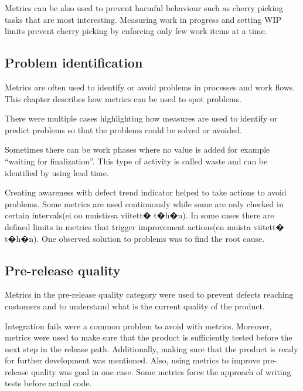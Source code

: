 \documentclass{sig-alternate}
\begin{document}
Metrics can be also used to prevent harmful behaviour such as cherry picking
tasks that are most interesting. Measuring work in progress and setting WIP
limits prevent cherry picking by enforcing only few work items at a
time.\cite{Middleton2007387}

\subsection{Problem identification}
\label{ProblemIdentification}
Metrics are often used to identify or avoid problems in
processes and work flows. This chapter describes how metrics
can be used to spot problems.

There were multiple cases highlighting how measures are used to identify or
predict problems so that the problems could be solved or
avoided\cite{Petersen2011975}\cite{Trapa2006243}\cite{Mahnic201273}\cite{Petersen2010654}\cite{Shen200725}\cite{Mujtaba2010139}\cite{Tudor2006367}.

Sometimes there can be work phases where no value is added for example ``waiting
for finalization''. This type of activity is called waste and can be identified by using
lead time.\cite{Petersen2012108}

Creating awareness with defect trend indicator helped to take actions to avoid
problems\cite{Staron20101069}. Some metrics are used continuously while some
are only checked in certain intervals(ei oo muistissa viitett� t�h�n). In some
cases there are defined limits in metrics that trigger improvement actions(en
muista viitett� t�h�n).
One observed solution to problems was to find the root
cause\cite{Jakobsen2011168}\cite{Middleton2007387}.

\subsection{Pre-release quality}
\label{PreQuality}
Metrics in the pre-release quality
category were used to prevent defects reaching customers
and to understand what is the current quality of the
product.

Integration fails were a common problem to avoid with
metrics\cite{Cataldo2011161}\cite{Janus20129}. Moreover, metrics were used to
make sure that the product is sufficiently tested before the next step
in the release path\cite{Janus20129}\cite{Dubinsky200512}. Additionally,
making sure that the product is ready for further
development was mentioned. Also, using metrics to improve
pre-release quality was goal in one case\cite{Janus20129}. Some
metrics force the approach of writing tests before actual
code\cite{Trapa2006243}.
\end{document}
